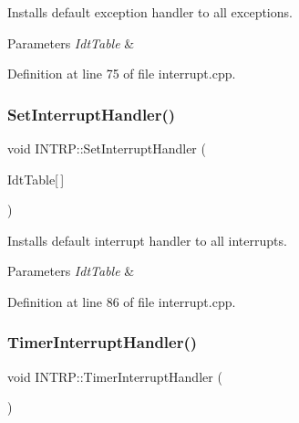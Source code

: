 Installs default exception handler to all exceptions. 


\begin{DoxyParams}{Parameters}
{\em Idt\+Table} & \\
\hline
\end{DoxyParams}


Definition at line 75 of file interrupt.\+cpp.

\mbox{\label{namespace_i_n_t_r_p_abf09ee877603981fe255cd050cbbb110}} 
\subsubsection{\texorpdfstring{Set\+Interrupt\+Handler()}{SetInterruptHandler()}}
{\footnotesize\ttfamily void I\+N\+T\+R\+P\+::\+Set\+Interrupt\+Handler (\begin{DoxyParamCaption}\item[{\hyperlink{union_i_n_t_r_p_1_1_descriptor_entry}{Descriptor\+Entry}}]{Idt\+Table\mbox{[}$\,$\mbox{]} }\end{DoxyParamCaption})}



Installs default interrupt handler to all interrupts. 


\begin{DoxyParams}{Parameters}
{\em Idt\+Table} & \\
\hline
\end{DoxyParams}


Definition at line 86 of file interrupt.\+cpp.

\mbox{\label{namespace_i_n_t_r_p_a0232249076503af19eee46e59a4e5bb8}} 
\subsubsection{\texorpdfstring{Timer\+Interrupt\+Handler()}{TimerInterruptHandler()}}
{\footnotesize\ttfamily void I\+N\+T\+R\+P\+::\+Timer\+Interrupt\+Handler (\begin{DoxyParamCaption}{ }\end{DoxyParamCaption})}



